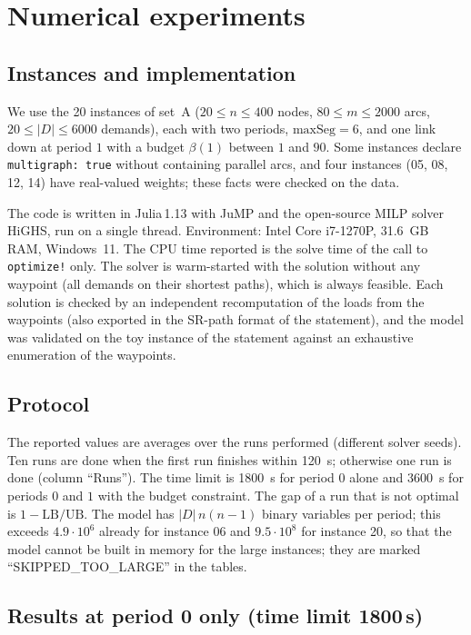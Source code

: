 \section{Numerical experiments}
\subsection{Instances and implementation}
We use the 20 instances of set~A ($20\le n\le 400$ nodes, $80\le m\le 2000$ arcs, $20\le |D|\le 6000$ demands), each with two periods, $\mathrm{maxSeg}=6$, and one link down at period $1$ with a budget $\beta(1)$ between $1$ and $90$. Some instances declare \texttt{multigraph: true} without containing parallel arcs, and four instances (05, 08, 12, 14) have real-valued weights; these facts were checked on the data.

The code is written in Julia\,1.13 with JuMP and the open-source MILP solver HiGHS, run on a single thread. Environment: Intel Core i7-1270P, 31.6~GB RAM, Windows~11. The CPU time reported is the solve time of the call to \texttt{optimize!} only. The solver is warm-started with the solution without any waypoint (all demands on their shortest paths), which is always feasible. Each solution is checked by an independent recomputation of the loads from the waypoints (also exported in the SR-path format of the statement), and the model was validated on the toy instance of the statement against an exhaustive enumeration of the waypoints.

\subsection{Protocol}
The reported values are averages over the runs performed (different solver seeds). Ten runs are done when the first run finishes within 120~s; otherwise one run is done (column ``Runs''). The time limit is 1800~s for period $0$ alone and 3600~s for periods $0$ and $1$ with the budget constraint. The gap of a run that is not optimal is $1-\mathrm{LB}/\mathrm{UB}$.
The model has $|D|\,n(n-1)$ binary variables per period; this exceeds $4.9\cdot 10^6$ already for instance 06 and $9.5\cdot10^8$ for instance 20, so that the model cannot be built in memory for the large instances; they are marked ``SKIPPED\_TOO\_LARGE'' in the tables.

\subsection{Results at period 0 only (time limit 1800\,s)}
\begin{table}[h]\centering\scriptsize
\resizebox{\linewidth}{!}{}
\caption{Period 0 only. Model \texttt{arc-pc}: arc-based MILP of the statement with the split coefficients of \texttt{calculating\_r.pdf}; time, gap and nodes are averages over the runs listed in column Runs. Rows from the waypoint model (restricted problem, at most one waypoint per demand) are used when the arc-based model does not fit in memory.}
\label{tab:p0}
\end{table}

